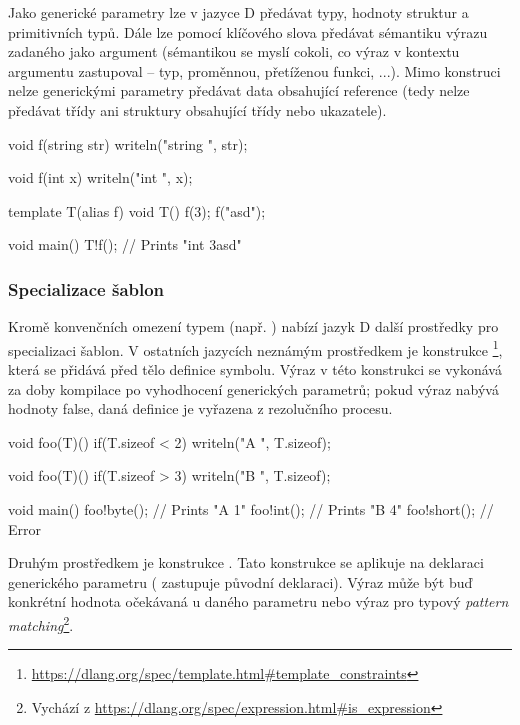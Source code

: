 Jako generické parametry lze v jazyce D předávat typy, hodnoty struktur a primitivních typů. Dále lze pomocí klíčového slova  předávat sémantiku výrazu zadaného jako argument (sémantikou se myslí cokoli, co výraz v kontextu argumentu zastupoval -- typ, proměnnou, přetíženou funkci, ...). Mimo konstruci  nelze generickými parametry předávat data obsahující reference (tedy nelze předávat třídy ani struktury obsahující třídy nebo ukazatele).

\begin{dcode}
void f(string str) {
	writeln("string ", str);
}

void f(int x) {
	writeln("int ", x);
}

template T(alias f) {
	void T() {
		f(3);
		f("asd");
	}
}

void main() {
	T!f(); // Prints "int 3\nstring asd\n"
}
\end{dcode}

\subsubsection{Specializace šablon}
Kromě konvenčních omezení typem (např. ) nabízí jazyk D další prostředky pro specializaci šablon. V ostatních jazycích neznámým prostředkem je konstrukce \footnote{\url{https://dlang.org/spec/template.html\#template_constraints}}, která se přidává před tělo definice symbolu. Výraz  v této konstrukci se vykonává za doby kompilace po vyhodhocení generických parametrů; pokud výraz nabývá hodnoty false, daná definice je vyřazena z rezolučního procesu.

\begin{dcode}
void foo(T)() if(T.sizeof < 2) {
	writeln("A ", T.sizeof);
}

void foo(T)() if(T.sizeof > 3) {
	writeln("B ", T.sizeof);
}

void main() {
	foo!byte(); // Prints "A 1"
	foo!int(); // Prints "B 4"
	foo!short(); // Error
}
\end{dcode}

Druhým prostředkem je konstrukce . Tato konstrukce se aplikuje na deklaraci generického parametru ( zastupuje původní deklaraci). Výraz  může být buď konkrétní hodnota očekávaná u daného parametru nebo výraz pro typový \textit{pattern matching}\footnote{Vychází z \url{https://dlang.org/spec/expression.html\#is_expression}}.

